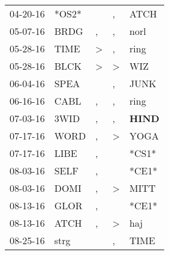 \begin{supertabular}{p{0.07\textwidth}p{0.06\textwidth}p{0.02\textwidth}p{0.02\textwidth}p{0.06\textwidth}}
          04-20-16\textsuperscript{} &                            *OS2* &                  &                , &           ATCH\textsuperscript{} \\
          05-07-16\textsuperscript{} &           BRDG\textsuperscript{} &                , &                , &           norl\textsuperscript{} \\
          05-28-16\textsuperscript{} &           TIME\textsuperscript{} &     \textgreater &                , &           ring\textsuperscript{} \\
          05-28-16\textsuperscript{} &           BLCK\textsuperscript{} &     \textgreater &     \textgreater &            WIZ\textsuperscript{} \\
          06-04-16\textsuperscript{} &           SPEA\textsuperscript{} &                  &                , &           JUNK\textsuperscript{} \\
          06-16-16\textsuperscript{} &           CABL\textsuperscript{} &                , &                , &           ring\textsuperscript{} \\
          07-03-16\textsuperscript{} &           3WID\textsuperscript{} &                , &                , &  \textbf{HIND\textsuperscript{}} \\
          07-17-16\textsuperscript{} &           WORD\textsuperscript{} &                , &     \textgreater &           YOGA\textsuperscript{} \\
          07-17-16\textsuperscript{} &           LIBE\textsuperscript{} &                , &                  &                            *CS1* \\
          08-03-16\textsuperscript{} &           SELF\textsuperscript{} &                , &                  &                            *CE1* \\
          08-03-16\textsuperscript{} &           DOMI\textsuperscript{} &                , &     \textgreater &           MITT\textsuperscript{} \\
          08-13-16\textsuperscript{} &           GLOR\textsuperscript{} &                , &                  &                            *CE1* \\
          08-13-16\textsuperscript{} &           ATCH\textsuperscript{} &                , &     \textgreater &            haj\textsuperscript{} \\
          08-25-16\textsuperscript{} &           strg\textsuperscript{} &                  &                , &           TIME\textsuperscript{} \\

\end{supertabular}
